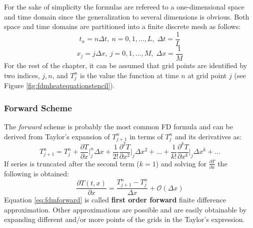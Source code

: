 For the sake of simplicity the formulas are refereed to a one-dimensional space and time domain since the generalization to several dimensions is obvious.
Both space and time domains are partitioned into a finite discrete mesh as follows:    
 \begin{equation}
    		t_n = n\Delta t, \: n = 0,1,\ldots,L,\; \Delta t= \frac{1}{L}
    \end{equation}
    \begin{equation}
    		x_j = j\Delta x, \: j = 0,1,\ldots,M,\;\Delta x = \frac{1}{M}
    \end{equation}
For the rest of the chapter, it can be assumed that grid points are identified by two indices, $j,n$, and $T_j^n$ is the value the function at time $n$ at grid point $j$ (see Figure \ref{fig:fdmheatequationstencil}).

\subsubsection{Forward Scheme}
    The \textit{forward} scheme is probably the most common FD formula and can be derived from Taylor's expansion of $T^n_{j+1}$ in terms of $T^n_{j}$ and its derivatives as:
    \begin{equation}
    T^n_{j+1} = T^n_{j} +
    \frac{\partial T}{\partial x}\bigg\rvert^n_j \Delta x +
    \frac{1}{2!}  \frac{\partial^2 T}{\partial x^2}\bigg\rvert_j \Delta x^2 + \ldots + 
     \frac{1}{k!}  \frac{\partial^k T}{\partial x^k}\bigg\rvert_j \Delta x^k + \ldots
     \label{eq:taylorexp1}
    \end{equation}    
    If series is truncated after the second term ($k=1$) and solving for $\frac{\partial T}{\partial x}$ the following is obtained:
    \begin{equation}
    \frac{\partial T(t,x)}{\partial x}  = \frac{T^n_{j+1} - T^n_{j}}{\Delta x} + \mathcal{O}(\Delta x)
    \label{eq:fdmforward}
    \end{equation}    
    Equation \ref{eq:fdmforward} is called \textbf{first order forward} finite difference approximation. Other approximations are possible and are easily obtainable by expanding different and/or more points of the grids in the Taylor's expression.
    
